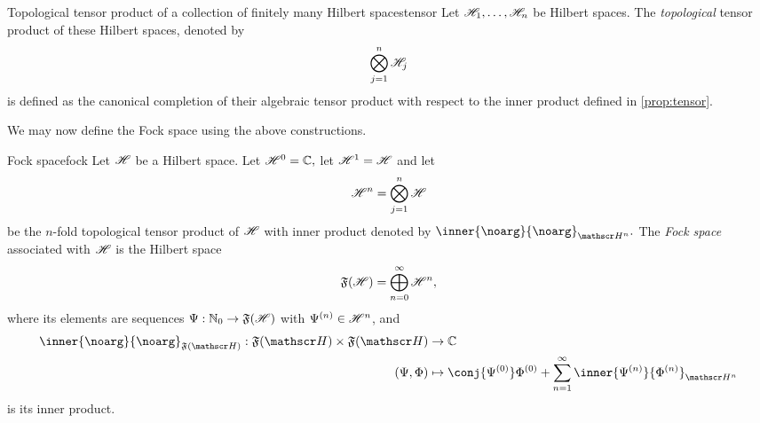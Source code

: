 \begin{definition}{Topological tensor product of a collection of finitely many Hilbert spaces}{tensor}
    Let \(\mathscr{H}_1, \dots, \mathscr{H}_n\) be Hilbert spaces. The \emph{topological} tensor product of these Hilbert spaces, denoted by
    \begin{equation*}
        \bigotimes_{j = 1}^n{\mathscr{H}_j}
    \end{equation*}
    is defined as the canonical completion of their algebraic tensor product with respect to the inner product defined in \cref{prop:tensor}.
\end{definition}

We may now define the Fock space using the above constructions.
\begin{definition}{Fock space}{fock}
    Let \(\mathscr{H}\) be a Hilbert space. Let \(\mathscr{H}^0 = \mathbb{C},\) let \(\mathscr{H}^1 = \mathscr{H}\) and let
    \begin{equation*}
        \mathscr{H}^n = \bigotimes_{j = 1}^n \mathscr{H}
    \end{equation*}
    be the \(n\)-fold topological tensor product of \(\mathscr{H}\) with inner product denoted by \(\inner{\noarg}{\noarg}_{\hilbert^n}.\) The \emph{Fock space} associated with \(\mathscr{H}\) is the Hilbert space
    \begin{equation*}
        \mathfrak{F}(\mathscr{H}) = \bigoplus_{n = 0}^\infty \mathscr{H}^n,
    \end{equation*}
    where its elements are sequences \(\Psi : \mathbb{N}_0 \to \mathfrak{F}(\mathscr{H})\) with \(\Psi^{(n)} \in \mathscr{H}^n\), and 
    \begin{align*}
        \inner{\noarg}{\noarg}_{\mathfrak{F}(\hilbert)} : \mathfrak{F}(\hilbert) \times \mathfrak{F}(\hilbert) &\to \mathbb{C}\\
        (\Psi, \Phi) &\mapsto \conj{\Psi^{(0)}}\Phi^{(0)} + \sum_{n = 1}^\infty{\inner{\Psi^{(n)}}{\Phi^{(n)}}_{\hilbert^n}}
    \end{align*}
    is its inner product.
\end{definition}

